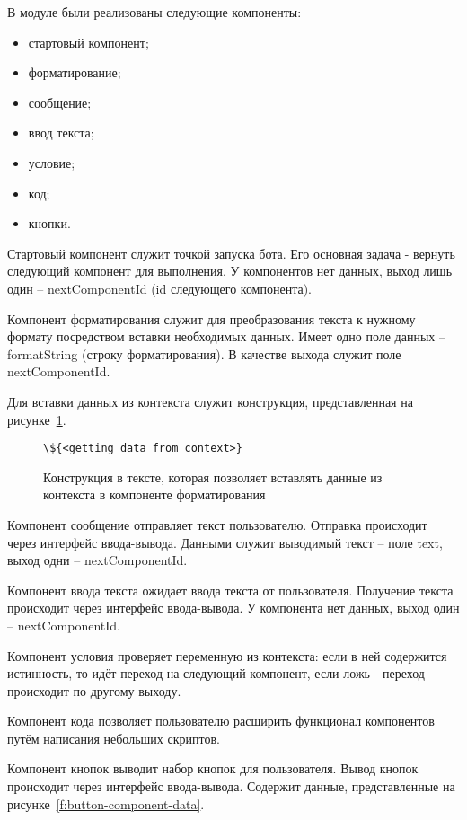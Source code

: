 В модуле были реализованы следующие компоненты:
\begin{itemize}
	\item стартовый компонент;
	\item форматирование;
	\item сообщение;
	\item ввод текста;
	\item условие;
	\item код;
	\item кнопки.
\end{itemize}


Стартовый компонент служит точкой запуска бота. Его основная задача
- вернуть следующий компонент для выполнения. У компонентов нет данных,
выход лишь один – nextComponentId (id следующего компонента).

Компонент форматирования служит для преобразования текста к
нужному формату посредством вставки необходимых данных. Имеет одно
поле данных – formatString (строку форматирования). В качестве выхода
служит поле nextComponentId.

Для вставки данных из контекста служит
конструкция, представленная на рисунке~\ref{f:format-construct}.


\begin{figure}[ht]
	\centering
	\vspace{\toppaddingoffigure}
	\begin{lstlisting}
\${<getting data from context>}
    \end{lstlisting}
	\caption{Конструкция в тексте, которая позволяет вставлять данные из
		контекста в компоненте форматирования}
	\label{f:format-construct}
\end{figure}


Компонент сообщение отправляет текст пользователю. Отправка
происходит через интерфейс ввода-вывода. Данными служит выводимый
текст – поле text, выход одни – nextComponentId.

Компонент ввода текста ожидает ввода текста от пользователя.
Получение текста происходит через интерфейс ввода-вывода. У компонента
нет данных, выход один – nextComponentId.

Компонент условия проверяет переменную из контекста: если в ней содержится
истинность, то идёт переход на следующий компонент, если ложь - переход происходит
по другому выходу.

Компонент кода позволяет пользователю расширить функционал компонентов путём
написания небольших скриптов.

Компонент кнопок выводит набор кнопок для пользователя. Вывод
кнопок происходит через интерфейс ввода-вывода.
Содержит данные, представленные на рисунке~\ref{f:button-component-data}.

